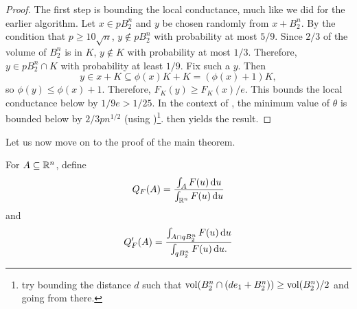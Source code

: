 \begin{proof}
	The first step is bounding the local conductance, much like we did for the earlier algorithm. Let $x\in pB_2^n$ and $y$ be chosen randomly from $x+B_2^n$. By the condition that $p\geq 10\sqrt{n}$, $y\not\in pB_2^n$ with probability at most $5/9$. Since $2/3$ of the volume of $B_2^n$ is in $K$, $y\not\in K$ with probability at most $1/3$. Therefore, $y\in pB_2^n\cap K$ with probability at least $1/9$. Fix such a $y$. Then
	\[ y\in x+K\subseteq \phi(x)K + K = (\phi(x)+1)K, \]
	so $\phi(y)\leq\phi(x)+1$. Therefore, $F_K(y)\geq F_K(x)/e$. This bounds the local conductance below by $1/9e > 1/25$. In the context of , the minimum value of $\theta$ is bounded below by $2/3pn^{1/2}$ (using )\footnote{try bounding the distance $d$ such that $\operatorname{vol}(B_2^n \cap (de_1 + B_2^n)) \geq \operatorname{vol}(B_2^n)/2$ and going from there.}.  then yields the result.
\end{proof}

Let us now move on to the proof of the main theorem.

For $A\subseteq\mathbb{R}^n$, define
\[ Q_F(A) = \frac{\int_A F(u)\operatorname{d}\!{u}}{\int_{\mathbb{R}^n} F(u)\operatorname{d}\!{u}} \]
and
\[ Q_F'(A) = \frac{\int_{A\cap qB_2^n} F(u)\operatorname{d}\!{u}}{\int_{qB_2^n} F(u)\operatorname{d}\!{u}. } \]

